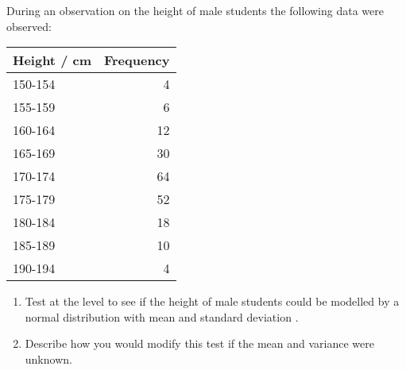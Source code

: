\documentclass{article}
\begin{document}
During an observation on the height of  male students the
following data were observed:\begin{table}[h!]

    \centering

    \begin{tabular}{lr}

        \toprule

        Height / cm & Frequency \\

        \midrule

        150-154     & 4 \\
        155-159     & 6 \\
        160-164     & 12 \\
        165-169     & 30 \\
        170-174     & 64 \\
        175-179     & 52 \\
        180-184     & 18 \\
        185-189     & 10 \\
        190-194     & 4 \\

        \bottomrule

    \end{tabular}

\end{table}\begin{enumerate}

    \item Test at the  level to see if the height of male
        students could be modelled by a normal distribution with mean
         and standard deviation .

    \item Describe how you would modify this test if the mean and variance were
        unknown.

\end{enumerate}
\end{document}
